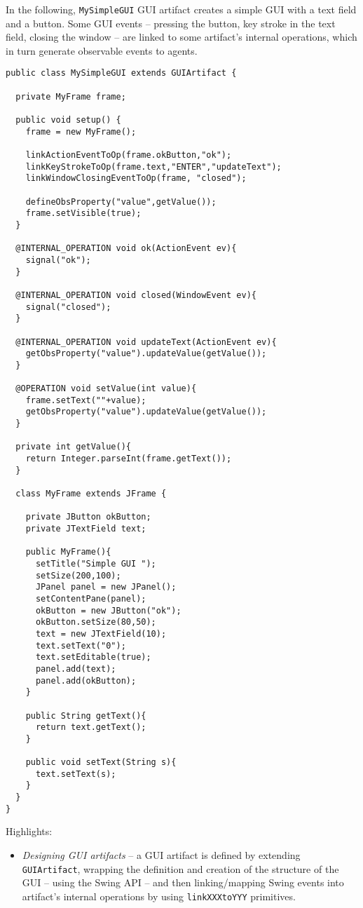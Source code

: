 \documentclass[11pt]{report}
\newcommand\code[1]{{\small{\mbox{\texttt{{#1}}}}}}
\begin{document}
%
In the following, \code{MySimpleGUI} GUI artifact creates a simple GUI with a text field and a button.
%
Some GUI events -- pressing the button, key stroke in the text field, closing the window -- are linked to some artifact's internal operations, which in turn generate observable events to agents.
%
{\small{\begin{verbatim}
public class MySimpleGUI extends GUIArtifact {

  private MyFrame frame;
  
  public void setup() {
    frame = new MyFrame();
    
    linkActionEventToOp(frame.okButton,"ok");
    linkKeyStrokeToOp(frame.text,"ENTER","updateText");
    linkWindowClosingEventToOp(frame, "closed");

    defineObsProperty("value",getValue());
    frame.setVisible(true);   
  }

  @INTERNAL_OPERATION void ok(ActionEvent ev){
    signal("ok");
  }

  @INTERNAL_OPERATION void closed(WindowEvent ev){
    signal("closed");
  }
  
  @INTERNAL_OPERATION void updateText(ActionEvent ev){
    getObsProperty("value").updateValue(getValue());
  }

  @OPERATION void setValue(int value){
    frame.setText(""+value);
    getObsProperty("value").updateValue(getValue());
  }

  private int getValue(){
    return Integer.parseInt(frame.getText());
  }
  
  class MyFrame extends JFrame {    
    
    private JButton okButton;
    private JTextField text;
    
    public MyFrame(){
      setTitle("Simple GUI ");
      setSize(200,100);
      JPanel panel = new JPanel();
      setContentPane(panel);
      okButton = new JButton("ok");
      okButton.setSize(80,50);
      text = new JTextField(10);
      text.setText("0");
      text.setEditable(true);
      panel.add(text);
      panel.add(okButton);
    }
    
    public String getText(){
      return text.getText();
    }

    public void setText(String s){
      text.setText(s);
    }
  }
}
\end{verbatim}}}
%
\noindent Highlights:
%
\begin{itemize}
%
\item \emph{Designing GUI artifacts} -- a GUI artifact is defined by extending \code{GUIArtifact}, wrapping the definition and creation of the structure of the GUI -- using the Swing API -- and then linking/mapping Swing events into artifact's internal operations by using \code{linkXXXtoYYY} primitives.
%
\end{itemize} 
\end{document}
